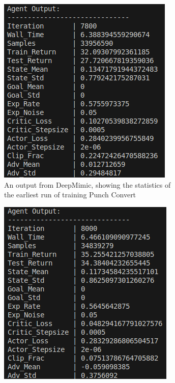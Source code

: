 \documentclass{l4proj}
\begin{document}
\begin{figure}
  \centering
  \begin{subfigure}[b]{0.45\textwidth}
    \includegraphics[width=\textwidth]{images/punch_convert_output.png}
    \caption{An output from DeepMimic, showing the statistics of the earliest run of training Punch Convert}
    \label{fig:punchconvertoutput1}
  \end{subfigure}
  \begin{subfigure}[b]{0.45\textwidth}
    \includegraphics[width=\textwidth]{images/punch_convert_output_2.png}

\end{subfigure}
\end{figure}
\end{document}
